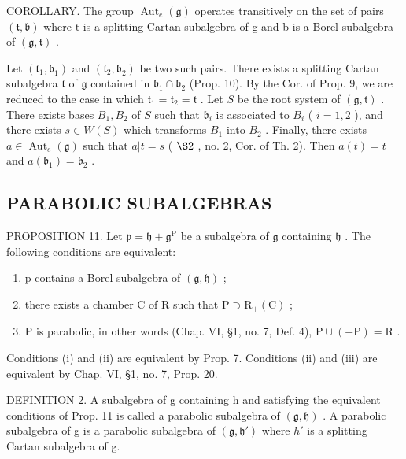 COROLLARY. The group \(\operatorname{Aut}_{e}(\mathfrak{g})\) operates transitively on the set of pairs \((\mathfrak{t},\mathfrak{b})\) where t is a splitting Cartan subalgebra of g and b is a Borel subalgebra of \((\mathfrak{g},\mathfrak{t})\) .

Let \((\mathfrak{t}_1, \mathfrak{b}_1)\) and \((\mathfrak{t}_2, \mathfrak{b}_2)\) be two such pairs. There exists a splitting Cartan subalgebra \(\mathfrak{t}\) of \(\mathfrak{g}\) contained in \(\mathfrak{b}_1 \cap \mathfrak{b}_2\) (Prop. 10). By the Cor. of Prop. 9, we are reduced to the case in which \(\mathfrak{t}_1 = \mathfrak{t}_2 = \mathfrak{t}\) . Let \(S\) be the root system of \((\mathfrak{g}, \mathfrak{t})\) . There exists bases \(B_1, B_2\) of \(S\) such that \(\mathfrak{b}_i\) is associated to \(B_i\) ( \(i = 1, 2\) ), and there exists \(s \in W(S)\) which transforms \(B_1\) into \(B_2\) . Finally, there exists \(a \in \operatorname{Aut}_e(\mathfrak{g})\) such that \(a|t = s\) ( \(\S 2\) , no. 2, Cor. of Th. 2). Then \(a(t) = t\) and \(a(\mathfrak{b}_1) = \mathfrak{b}_2\) .

\subsection{PARABOLIC SUBALGEBRAS}

PROPOSITION 11. Let \(\mathfrak{p} = \mathfrak{h} + \mathfrak{g}^{\mathrm{P}}\) be a subalgebra of \(\mathfrak{g}\) containing \(\mathfrak{h}\) . The following conditions are equivalent:

\begin{enumerate}
\def\labelenumi{(\roman{enumi})}
\item
  p contains a Borel subalgebra of \((\mathfrak{g}, \mathfrak{h})\) ;
\item
  there exists a chamber C of R such that \(\mathrm{P} \supset \mathrm{R}_{+}(\mathrm{C})\) ;
\item
  P is parabolic, in other words (Chap. VI, §1, no. 7, Def. 4), \(\mathrm{P} \cup (-\mathrm{P}) = \mathrm{R}\) .
\end{enumerate}

Conditions (i) and (ii) are equivalent by Prop. 7. Conditions (ii) and (iii) are equivalent by Chap. VI, §1, no. 7, Prop. 20.

DEFINITION 2. A subalgebra of g containing h and satisfying the equivalent conditions of Prop. 11 is called a parabolic subalgebra of \((\mathfrak{g}, \mathfrak{h})\) . A parabolic subalgebra of g is a parabolic subalgebra of \((\mathfrak{g}, \mathfrak{h}')\) where \(h'\) is a splitting Cartan subalgebra of g.

